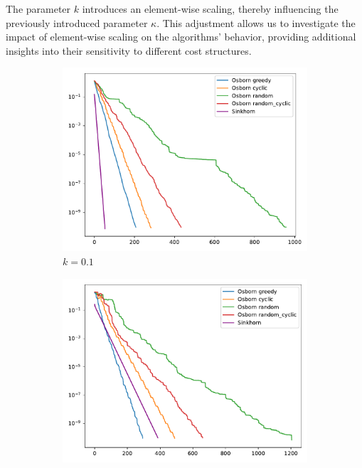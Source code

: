 The parameter \(k\) introduces an element-wise scaling, thereby influencing the previously introduced parameter \(\kappa\). This adjustment allows us to investigate the impact of element-wise scaling on the algorithms' behavior, providing additional insights into their sensitivity to different cost structures.

\begin{figure}[H]
    \centering
    \begin{subfigure}[b]{.18\textwidth}
        \centering
        \includegraphics[width=\textwidth]{figures/dist2_k/osborn_vs_sinkhorn_dist2_0.01_1e-10_2_0.1}
        \caption{\(k = 0.1\)}
    \end{subfigure}
    \hfill
    \begin{subfigure}[b]{.18\textwidth}
        \centering
        \includegraphics[width=\textwidth]{figures/dist2_k/osborn_vs_sinkhorn_dist2_0.01_1e-10_2_0.5}

\end{subfigure}
\end{figure}
